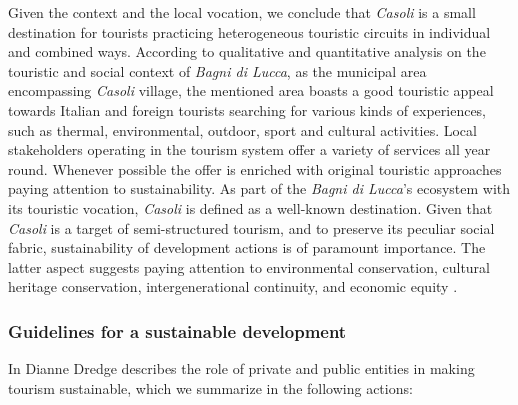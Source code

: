 \documentclass[sustainability,article,submit,pdftex,moreauthors]{Definitions/mdpi}
\begin{document}
Given the context and the local vocation, we conclude that \emph{Casoli} is a small destination for tourists practicing heterogeneous touristic circuits in individual and combined ways. According to qualitative and quantitative analysis \cite{loz09} on the touristic and social context of \emph{Bagni di Lucca}, as the municipal area encompassing \emph{Casoli} village, the mentioned area boasts a good touristic appeal towards Italian and foreign tourists searching for various kinds of experiences, such as thermal, environmental, outdoor, sport and cultural activities. Local stakeholders operating in the tourism system offer a variety of services all year round. Whenever possible the offer is enriched with original touristic approaches paying attention to sustainability. As part of the \emph{Bagni di Lucca}’s ecosystem with its touristic vocation, \emph{Casoli} is defined as a well-known destination. Given that \emph{Casoli} is a target of semi-structured tourism, and to preserve its peculiar social fabric, sustainability of development actions is of paramount importance. The latter aspect suggests paying attention to environmental conservation, cultural heritage conservation, intergenerational continuity, and economic equity \cite{kuh10}.

\subsubsection{Guidelines for a sustainable development}

In \cite{dre22} Dianne Dredge describes the role of private and public entities in making tourism sustainable, which we summarize in the following actions:


\end{document}
